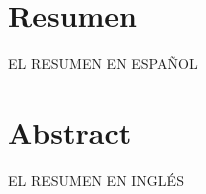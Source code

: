 \chapter*{Resumen}
\thispagestyle{empty}
EL RESUMEN EN ESPAÑOL
\thispagestyle{empty}

\chapter*{Abstract}
\thispagestyle{empty}
EL RESUMEN EN INGLÉS
